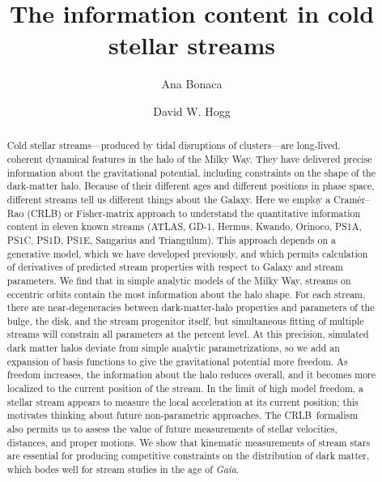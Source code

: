 \documentclass[modern]{aastex61}
\newcommand{\acronym}[1]{{\small{#1}}}
\newcommand{\CRLB}{\acronym{CRLB}}
\begin{document}
\sloppy\sloppypar\raggedbottom\frenchspacing %

\title{The information content in cold stellar streams}


\author[0000-0002-7846-9787]{Ana Bonaca}

\author[0000-0003-2866-9403]{David W. Hogg}

\begin{abstract}\noindent %
Cold stellar streams---produced by tidal disruptions of clusters---are long-lived, coherent dynamical features in the halo of the Milky Way.
They have delivered precise information about the gravitational potential, including constraints on the shape of the dark-matter halo.
Because of their different ages and different positions in phase space, different streams tell us different things about the Galaxy.
Here we employ a Cram\'er--Rao (\CRLB) or Fisher-matrix approach to understand the quantitative information content in eleven known streams (ATLAS, GD-1, Hermus, Kwando, Orinoco, PS1A, PS1C, PS1D, PS1E, Sangarius and Triangulum).
This approach depends on a generative model, which we have developed previously, and which permits calculation of derivatives of predicted stream properties with respect to Galaxy and stream parameters.
We find that in simple analytic models of the Milky Way, streams on eccentric orbits contain the most information about the halo shape.
For each stream, there are near-degeneracies between dark-matter-halo properties and parameters of the bulge, the disk, and the stream progenitor itself, but simultaneous fitting of multiple streams will constrain all parameters at the percent level.
At this precision, simulated dark matter halos deviate from simple analytic parametrizations, so we add an expansion of basis functions to give the gravitational potential more freedom.
As freedom increases, the information about the halo reduces overall, and it becomes more localized to the current position of the stream.
In the limit of high model freedom, a stellar stream appears to measure the local acceleration at its current position; this motivates thinking about future non-parametric approaches.
The \CRLB\ formalism also permits us to assess the value of future measurements of stellar velocities, distances, and proper motions.
We show that kinematic measurements of stream stars are essential for producing competitive constraints on the distribution of dark matter, which bodes well for stream studies in the age of \textsl{Gaia}.
\end{abstract}
\end{document}
